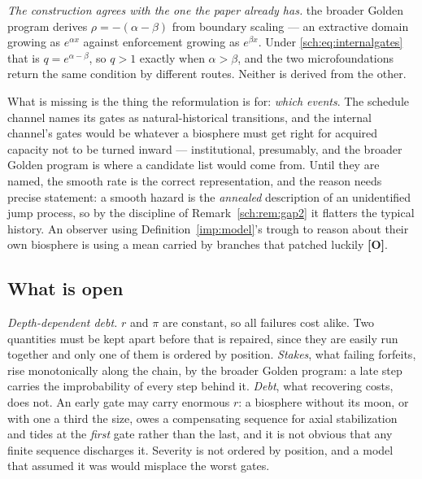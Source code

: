 \begin{remark}
\emph{The construction agrees with the one the paper already has.}
the broader Golden program derives $\rho=-(\alpha-\beta)$ from boundary
scaling --- an extractive domain growing as $e^{\alpha x}$ against
enforcement growing as $e^{\beta x}$. Under \eqref{sch:eq:internalgates}
that is $q=e^{\alpha-\beta}$, so $q>1$ exactly when $\alpha>\beta$, and
the two microfoundations return the same condition by different routes.
Neither is derived from the other.
\end{remark}

What is missing is the thing the reformulation is for: \emph{which
events}. The schedule channel names its gates as natural-historical
transitions, and the internal channel's gates would be whatever a
biosphere must get right for acquired capacity not to be turned inward
--- institutional, presumably, and the broader Golden program is where a
candidate list would come from. Until they are named, the smooth rate is the correct representation, and the reason needs precise statement: a
smooth hazard is the \emph{annealed} description of an unidentified jump
process, so by the discipline of Remark~\ref{sch:rem:gap2} it flatters
the typical history. An observer using Definition~\ref{imp:model}'s trough to
reason about their own biosphere is using a mean carried by branches that
patched luckily \textbf{[O]}.

\subsection{What is open}\label{sch:subsub:open}

\emph{Depth-dependent debt.} $r$ and $\pi$ are constant, so all failures
cost alike. Two quantities must be kept apart before that is repaired,
since they are easily run together and only one of them is ordered by
position. \emph{Stakes}, what failing forfeits, rise monotonically
along the chain, by the broader Golden program: a late step carries
the improbability of every step behind it. \emph{Debt}, what
recovering costs, does not. An early gate may carry enormous $r$: a
biosphere without its moon, or with one a third the size, owes a
compensating sequence for axial stabilization and tides at the
\emph{first} gate rather than the last, and it is not obvious that any
finite sequence discharges it. Severity is not ordered by position, and
a model that assumed it was would misplace the worst gates.

